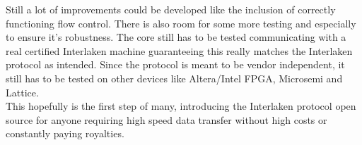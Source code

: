 Still a lot of improvements could be developed like the inclusion of correctly functioning flow control. There is also room for some more testing and especially to ensure it's robustness. The core still has to be tested communicating with a real certified Interlaken machine guaranteeing this really matches the Interlaken protocol as intended. Since the protocol is meant to be vendor independent, it still has to be tested on other devices like Altera/Intel FPGA, Microsemi and Lattice.\\

This hopefully is the first step of many, introducing the Interlaken protocol open source for anyone requiring high speed data transfer without high costs or constantly paying royalties.

\newpage